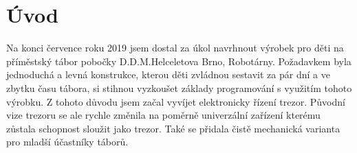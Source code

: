 \section*{Úvod}

Na konci července roku 2019 jsem dostal za úkol navrhnout výrobek pro děti na příměstský tábor pobočky D.D.M.Helceletova Brno, Robotárny. Požadavkem 
byla jednoduchá a levná konstrukce, kterou děti zvládnou sestavit za pár dní a ve zbytku času tábora, si stihnou vyzkoušet základy programování 
s využitím tohoto výrobku. Z tohoto důvodu jsem začal vyvíjet elektronicky řízení trezor. Původní vize trezoru se ale rychle změnila na poměrně 
univerzální zařízení kterému zůstala schopnost sloužit jako trezor. Také se přidala čistě mechanická varianta pro mladší účastníky táborů.




\newpage
